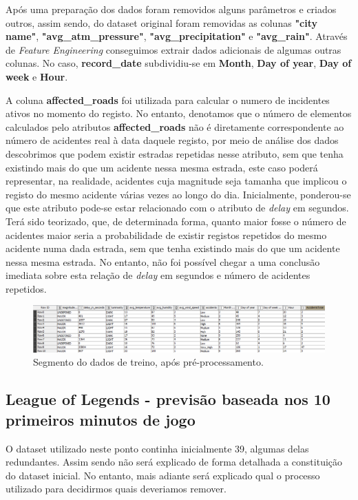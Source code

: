Após uma preparação dos dados foram removidos alguns parâmetros e criados outros, assim sendo, do dataset original foram removidas as colunas \textbf{"city name"}, \textbf{"avg\_atm\_pressure"}, \textbf{"avg\_precipitation"} e \textbf{"avg\_rain"}. Através de \textit{Feature Engineering} conseguimos extrair dados adicionais de algumas outras colunas. No caso, \textbf{record\_date} subdividiu-se em \textbf{Month}, \textbf{Day of year}, \textbf{Day of week} e \textbf{Hour}. 



A coluna \textbf{affected\_roads} foi utilizada para calcular o numero de incidentes ativos no momento do registo. No entanto, denotamos que o número de elementos calculados pelo atributos \textbf{affected\_roads} não é diretamente correspondente ao número de acidentes real à data daquele registo, por meio de análise dos dados descobrimos que podem existir estradas repetidas nesse atributo, sem que tenha existindo mais do que um acidente nessa mesma estrada, este caso poderá representar, na realidade, acidentes cuja magnitude seja tamanha que implicou o registo do mesmo acidente várias vezes ao longo do dia. Inicialmente, ponderou-se que este atributo pode-se estar relacionado com o atributo de \textit{delay} em segundos. Terá sido teorizado, que, de determinada forma, quanto maior fosse o número de acidentes maior seria a probabilidade de existir registos repetidos do mesmo acidente numa dada estrada, sem que tenha existindo mais do que um acidente nessa mesma estrada. No entanto, não foi possível chegar a uma conclusão imediata sobre esta relação de \textit{delay} em segundos e número de acidentes repetidos.


    \begin{figure}[H]
        \centering
        \includegraphics[width=0.8\linewidth]{Figures/excerto_dataset_braga.png}
        \caption{Segmento do dados de treino, após pré-processamento.}
        \label{fig:"um"}
    \end{figure} 

\subsection{League of Legends - previsão baseada nos 10 primeiros minutos de jogo}
O dataset utilizado neste ponto continha inicialmente 39, algumas delas redundantes. Assim sendo não será explicado de forma detalhada a constituição do dataset inicial. No entanto, mais adiante será explicado qual o processo utilizado para decidirmos quais deveriamos remover.

